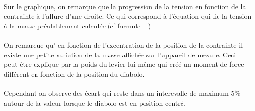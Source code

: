 \documentclass[10pt,a4paper]{report}
\begin{document}
\paragraph{} Sur le graphique, on remarque que la progression de la tension en fonction de la contrainte à l'allure d'une droite. Ce qui correspond à l'équation qui lie la tension à la masse  préalablement calculée.(cf formule ...)

\paragraph{}On remarque qu' en fonction de l'excentration de la position de la contrainte il existe une petite variation de la masse affichée sur l'appareil de mesure. Ceci peut-être explique par la poids du levier lui-même qui créé un moment de force différent en fonction de la position du diabolo. 

\paragraph{} Cependant on observe des écart qui reste dans un interevalle de maximum 5\% autour de la valeur lorsque le diabolo est en position centré.
\end{document}
